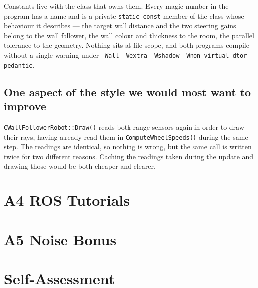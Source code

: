 \documentclass[10pt]{article}
\begin{document}
Constants live with the class that owns them. Every magic number in the
program has a name and is a private \texttt{static const} member of the class
whose behaviour it describes --- the target wall distance and the two steering
gains belong to the wall follower, the wall colour and thickness to the room,
the parallel tolerance to the geometry. Nothing sits at file scope, and both
programs compile without a single warning under
\texttt{-Wall -Wextra -Wshadow -Wnon-virtual-dtor -pedantic}.

\subsection{One aspect of the style we would most want to improve}

\texttt{CWallFollowerRobot::Draw()} reads both range sensors again in order to
draw their rays, having already read them in \texttt{ComputeWheelSpeeds()}
during the same step. The readings are identical, so nothing is wrong, but the
same call is written twice for two different reasons. Caching the readings
taken during the update and drawing those would be both cheaper and clearer.


\section{A4 ROS Tutorials}



\section{A5 Noise Bonus}



\section{Self-Assessment}

\end{document}
